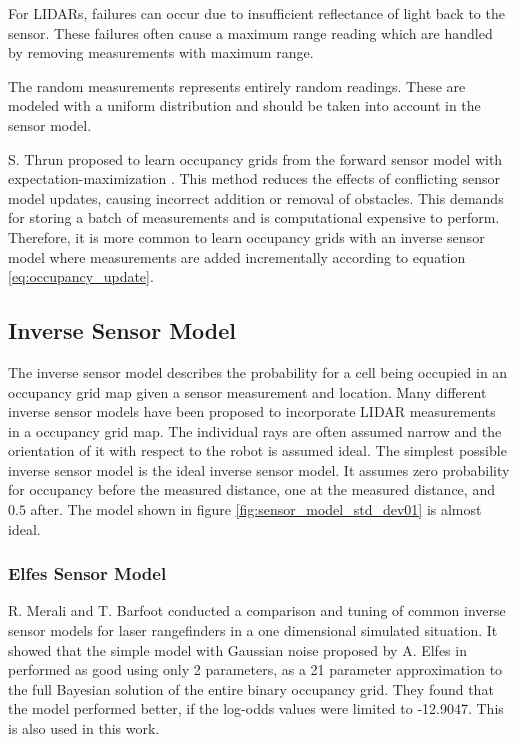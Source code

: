 For LIDARs, failures can occur due to insufficient reflectance of light back to the sensor. 
These failures often cause a maximum range reading which are handled by removing measurements with maximum range.

The random measurements represents entirely random readings. These are modeled with a uniform distribution and should be taken into account in the sensor model.

S. Thrun proposed to learn occupancy grids from the forward sensor model with expectation-maximization \cite{probRob}.
This method reduces the effects of conflicting sensor model updates, causing incorrect addition or removal of obstacles. 
This demands for storing a batch of measurements and is computational expensive to perform. 
Therefore, it is more common to learn occupancy grids with an inverse sensor model where measurements are added incrementally according to equation \vref{eq:occupancy_update}. 

\subsection{Inverse Sensor Model}
The inverse sensor model describes the probability for a cell being occupied in an occupancy grid map given a sensor measurement and location. 
Many different inverse sensor models have been proposed to incorporate LIDAR measurements in a occupancy grid map. The individual rays are often assumed narrow and the orientation of it with respect to the robot is assumed ideal.
The simplest possible inverse sensor model is the 
ideal inverse sensor model. It assumes zero probability for occupancy before the measured distance, one at the measured distance, and $0.5$ after. The model shown in figure \vref{fig:sensor_model_std_dev01} is almost ideal.

\subsubsection{Elfes Sensor Model}
R. Merali and T. Barfoot \cite{sensorModelTuning} conducted a comparison and tuning of common inverse sensor models for laser rangefinders in a one dimensional simulated situation. It showed that the simple model with Gaussian noise proposed by A. Elfes in \cite{elfes} performed as good using only 2 parameters, as a 21 parameter approximation to the full Bayesian solution of the entire binary occupancy grid. They found that the model performed better, if the log-odds values were limited to -12.9047. This is also used in this work.


